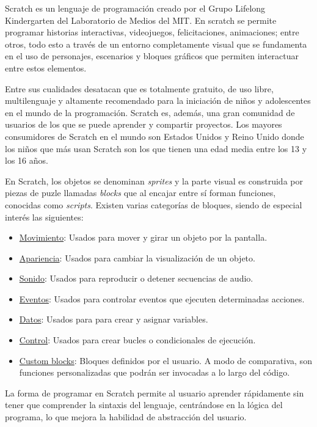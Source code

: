 \documentclass[a4paper, 12pt]{book}
\begin{document}
Scratch es un lenguaje de programación creado por el Grupo Lifelong Kindergarten del Laboratorio de Medios del MIT. En scratch se permite programar historias interactivas, videojuegos, felicitaciones, animaciones; entre otros, todo esto a través de un entorno completamente visual que se fundamenta en el uso de personajes, escenarios y bloques gráficos que permiten interactuar entre estos elementos.

Entre sus cualidades desatacan que es totalmente gratuito, de uso libre, multilenguaje y altamente recomendado para la iniciación de niños y adolescentes en el mundo de la programación. Scratch es, además, una gran comunidad de usuarios de los que se puede aprender y compartir proyectos. Los mayores consumidores de Scratch en el mundo son Estados Unidos y Reino Unido donde los niños que más usan Scratch son los que tienen una edad media entre los 13 y los 16 años.

En Scratch, los objetos se denominan \textit{sprites} y la parte visual es construida por piezas de puzle llamadas \textit{blocks} que al encajar entre sí forman funciones, conocidas como \textit{scripts}. Existen varias categorías de bloques, siendo de especial interés las siguientes: 

\begin{itemize}
  	\item \underline{Movimiento}: Usados para mover y girar un objeto por la pantalla.
  	\item \underline{Apariencia}: Usados para cambiar la visualización de un objeto.
  	\item \underline{Sonido}: Usados para reproducir o detener secuencias de audio.
  	\item \underline{Eventos}: Usados para controlar eventos que ejecuten determinadas acciones.
  	\item \underline{Datos}: Usados para para crear y asignar variables.
  	\item \underline{Control}: Usados para crear bucles o condicionales de ejecución.
  	\item \underline{Custom blocks}: Bloques definidos por el usuario. A modo de comparativa, son funciones personalizadas que podrán ser invocadas a lo largo del código.
\end{itemize}

La forma de programar en Scratch permite al usuario aprender rápidamente sin tener que comprender la sintaxis del lenguaje, centrándose en la lógica del programa, lo que mejora la habilidad de abstracción del usuario. \cite{arotuma2017programacion}
\end{document}
